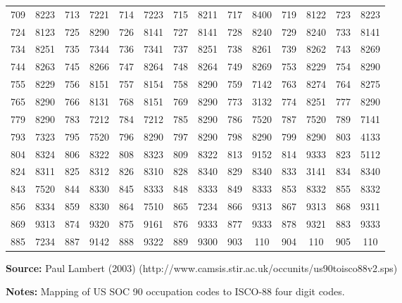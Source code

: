 \begin{threeparttable}
{\begin{tabular}{|cc|cc|cc|cc|cc|cc|cc|}
709 & 8223 & 713 & 7221 & 714 & 7223 & 715 & 8211 & 717 & 8400 & 719 & 8122 & 723 & 8223\\
724 & 8123 & 725 & 8290 & 726 & 8141 & 727 & 8141 & 728 & 8240 & 729 & 8240 & 733 & 8141\\
734 & 8251 & 735 & 7344 & 736 & 7341 & 737 & 8251 & 738 & 8261 & 739 & 8262 & 743 & 8269\\
744 & 8263 & 745 & 8266 & 747 & 8264 & 748 & 8264 & 749 & 8269 & 753 & 8229 & 754 & 8290\\
755 & 8229 & 756 & 8151 & 757 & 8154 & 758 & 8290 & 759 & 7142 & 763 & 8274 & 764 & 8275\\
765 & 8290 & 766 & 8131 & 768 & 8151 & 769 & 8290 & 773 & 3132 & 774 & 8251 & 777 & 8290\\
779 & 8290 & 783 & 7212 & 784 & 7212 & 785 & 8290 & 786 & 7520 & 787 & 7520 & 789 & 7141\\
793 & 7323 & 795 & 7520 & 796 & 8290 & 797 & 8290 & 798 & 8290 & 799 & 8290 & 803 & 4133\\
804 & 8324 & 806 & 8322 & 808 & 8323 & 809 & 8322 & 813 & 9152 & 814 & 9333 & 823 & 5112\\
824 & 8311 & 825 & 8312 & 826 & 8310 & 828 & 8340 & 829 & 8340 & 833 & 3141 & 834 & 8340\\
843 & 7520 & 844 & 8330 & 845 & 8333 & 848 & 8333 & 849 & 8333 & 853 & 8332 & 855 & 8332\\
856 & 8334 & 859 & 8330 & 864 & 7510 & 865 & 7234 & 866 & 9313 & 867 & 9313 & 868 & 9311\\
869 & 9313 & 874 & 9320 & 875 & 9161 & 876 & 9333 & 877 & 9333 & 878 & 9321 & 883 & 9333\\
885 & 7234 & 887 & 9142 & 888 & 9322 & 889 & 9300 & 903 & 110 & 904 & 110 & 905 & 110\\
\bottomrule
\end{tabular}
}
\begin{tablenotes}
  \small
  \item {\bf Source:} Paul Lambert (2003) (http://www.camsis.stir.ac.uk/occunits/us90toisco88v2.sps)
  \item {\bf Notes:} Mapping of US SOC 90 occupation codes to ISCO-88 four digit codes.
\end{tablenotes}
\end{threeparttable}